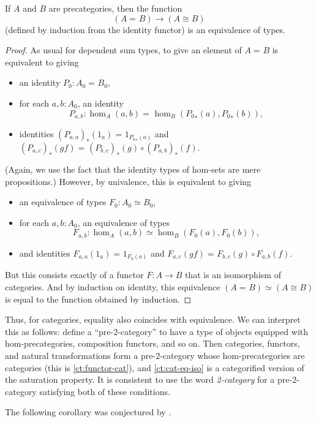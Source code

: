 \documentclass{mscs}
\newcommand{\id}[3][]{\ensuremath{#2 =_{#1} #3}\xspace}
\newcommand{\trans}[2]{\ensuremath{{#1}_{*}\!\left({#2}\right)}\xspace}
\newcommand{\eqv}[2]{\ensuremath{#1 \simeq #2}\xspace}
\numberwithin{equation}{section}
\begin{document}
\begin{lem}\label{ct:cat-eq-iso}
  If $A$ and $B$ are precategories, then the function
  \[(\id A B) \to (A\cong B)\]
  (defined by induction from the identity functor) is an equivalence of types.
\end{lem}
\begin{proof}
  As usual for dependent sum types, to give an element of $\id A B$ is equivalent to giving
  \begin{itemize}
  \item an identity $P_0:\id{A_0}{B_0}$,
  \item for each $a,b:A_0$, an identity
    \[P_{a,b}:\id{\hom_A(a,b)}{\hom_B(\trans {P_0} a,\trans {P_0} b)},\]
  \item identities $\id{\trans {(P_{a,a})} {1_a}}{1_{\trans {P_0} a}}$ and $\id{\trans {(P_{a,c})} {gf}}{\trans {(P_{b,c})} g \circ \trans {(P_{a,b})} f}$.
  \end{itemize}
  (Again, we use the fact that the identity types of hom-sets are mere propositions.)
  However, by univalence, this is equivalent to giving
  \begin{itemize}
  \item an equivalence of types $F_0:\eqv{A_0}{B_0}$,
  \item for each $a,b:A_0$, an equivalence of types
    \[F_{a,b}:\eqv{\hom_A(a,b)}{\hom_B(F_0 (a),F_0 (b))},\]
  \item and identities $\id{F_{a,a}(1_a)}{1_{F_0 (a)}}$ and $\id{F_{a,c}(gf)}{F_{b,c} (g)\circ F_{a,b} (f)}$.
  \end{itemize}
  But this consists exactly of a functor $F:A\to B$ that is an isomorphism of categories.
  And by induction on identity, this equivalence $\eqv{(\id A B)}{(A\cong B)}$ is equal to the function obtained by induction.
\end{proof}

Thus, for categories, equality also coincides with equivalence.
We can interpret this as follows: define a ``pre-2-category'' to have a type of objects equipped with hom-precategories, composition functors, and so on.
Then categories, functors, and natural transformations form a pre-2-category whose hom-precategories are categories (this is \autoref{ct:functor-cat}), and \autoref{ct:cat-eq-iso} is a categorified version of the saturation property.
It is consistent to use the word \emph{2-category} for a pre-2-category satisfying both of these conditions.

The following corollary was conjectured by \textcite{hs:gpd-typethy}.
\end{document}

